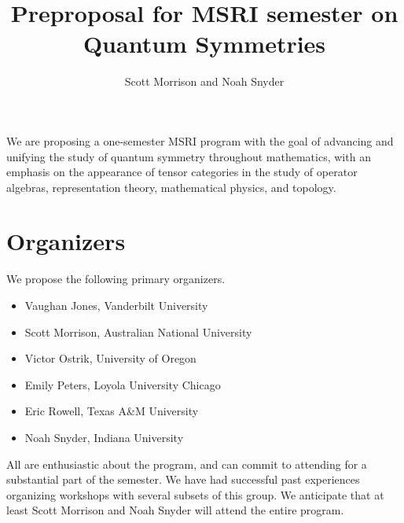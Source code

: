 \documentclass[12pt]{article}
\title{Preproposal for MSRI semester on \textbf{Quantum Symmetries}}
\author{Scott Morrison and Noah Snyder}
\begin{document}
\maketitle






We are proposing a one-semester MSRI program with the goal of advancing and unifying the study of quantum symmetry throughout mathematics, with an emphasis on the appearance of tensor categories in the study of operator algebras, representation theory, mathematical physics, and topology.

\section{Organizers}
We propose the following primary organizers.
\begin{itemize}
  \setlength{\itemsep}{1pt}
  \setlength{\parskip}{0pt}
  \setlength{\parsep}{0pt}
\item Vaughan Jones, Vanderbilt University
\item Scott Morrison, Australian National University
\item Victor Ostrik, University of Oregon
\item Emily Peters, Loyola University Chicago
\item Eric Rowell, Texas A\&M University
\item Noah Snyder, Indiana University
\end{itemize}
All are enthusiastic about the program, and can commit to attending for a substantial part of the semester. We have had successful past experiences organizing workshops with several subsets of this group.  We anticipate that at least Scott Morrison and Noah Snyder will attend the entire program.
\end{document}
